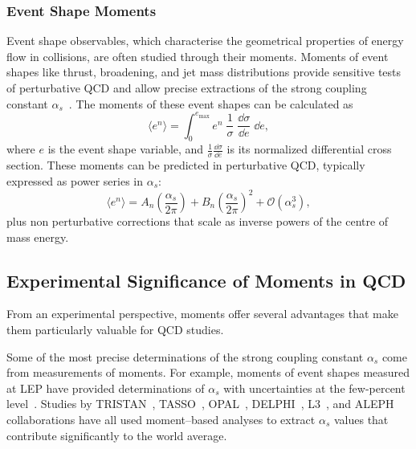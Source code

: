         \subsubsection{Event Shape Moments}
            Event shape observables, which characterise the geometrical properties of energy flow in collisions, are often studied through their moments.
            Moments of event shapes like thrust, broadening, and jet mass distributions provide sensitive tests of perturbative QCD and allow precise extractions of the strong coupling constant $\alpha_s$~\cite{gehrmann_resummation_2017, Catani:1992ua}.
            The moments of these event shapes can be calculated as
            \[
                \langle e^n \rangle = \int_0^{e_{\text{max}}} e^n \;\frac{1}{\sigma}\; \frac{\dd\sigma}{\dd e}\; \dd e,
            \]
            where $e$ is the event shape variable, and $\frac{1}{\sigma} \frac{\dd\sigma}{\dd e}$ is its normalized differential cross section.
            These moments can be predicted in perturbative QCD, typically expressed as power series in $\alpha_s$:
            \[
                \langle e^n \rangle = A_n \left(\frac{\alpha_s}{2\pi}\right) + B_n \left(\frac{\alpha_s}{2\pi}\right)^2 + \mathcal{O}(\alpha_s^3),
            \]
            plus non perturbative corrections that scale as inverse powers of the centre of mass energy.
    \subsection{Experimental Significance of Moments in QCD}
        From an experimental perspective, moments offer several advantages that make them particularly valuable for QCD studies.

        Some of the most precise determinations of the strong coupling constant $\alpha_s$ come from measurements of moments.
        For example, moments of event shapes measured at LEP have provided determinations of $\alpha_s$ with uncertainties at the few-percent level~\cite{Abbiendi2004Measurementalpha_s, Dasgupta2004EventScattering}.
        Studies by TRISTAN~\cite{Ohnishi1993MeasurementsTRISTAN, Kato1989Double-cascadeAnnihilation}, TASSO~\cite{Althoff1984DeterminationHadrons, Hoyer1979QuantumE+e-, Adeva1983Model-independents}, OPAL~\cite{2005Measurementensuremathalpha_mathrms,Alexander1996QCDGeV, Ackerstaff1997QCDGeV}, DELPHI~\cite{TheDELPHICollaboration2004TheEnergies, SkachkovJinr1994OnCollaborations}, L3~\cite{Achard2002Determination192s208GeV, Heister2004StudiesGeV, Adeva1990TheExperiment, Acciarri1997StudyGeV, Acciarri1996StudyGeV, Acciarri1997QCDCollaboration, Bohm2001MeasurementLeptons, Acciarri2000QCDGeV, Achard2002DeterminationGeV, Achard2002Determination192s208GeV}, and ALEPH~\cite{BuskulicTheCollaboration, Buskulic1997StudiesGeV, Decamp1992MeasurementPredictions} collaborations have all used moment--based analyses to extract $\alpha_s$ values that contribute significantly to the world average.

